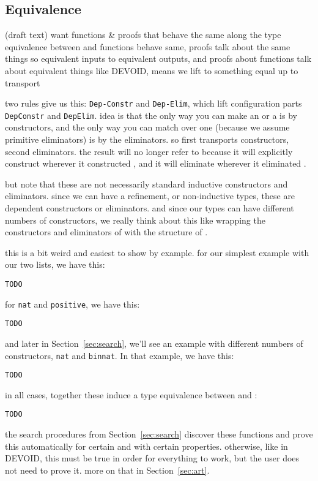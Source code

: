 \subsection{Equivalence}
\label{sec:equivalence}

(draft text) want functions \& proofs that behave the same along the type equivalence between \A and \B
functions behave same, proofs talk about the same things
so equivalent inputs to equivalent outputs, and proofs about functions talk about equivalent things
like DEVOID, means we lift to something equal up to transport

two rules give us this: \lstinline{Dep-Constr} and \lstinline{Dep-Elim},
which lift configuration parts \lstinline{DepConstr} and \lstinline{DepElim}.
idea is that the only way you can make an \A or a \B is by constructors, and the only way you can match over one
(because we assume primitive eliminators) is by the eliminators.
so first transports constructors, second eliminators.
the result will no longer refer to \A because it will explicitly construct \B wherever it constructed \A,
and it will eliminate \B wherever it eliminated \A.

but note that these are not necessarily standard inductive constructors and eliminators.
since we can have a refinement, or non-inductive types, these are dependent constructors or eliminators.
and since our types can have different numbers of constructors, we really think about this like
wrapping the constructors and eliminators of \B with the structure of \A.

this is a bit weird and easiest to show by example.
for our simplest example with our two lists, we have this:

\begin{lstlisting}
TODO
\end{lstlisting}
for \lstinline{nat} and \lstinline{positive}, we have this:

\begin{lstlisting}
TODO
\end{lstlisting}
and later in Section~\ref{sec:search}, we'll see an example with different numbers of constructors,
\lstinline{nat} and \lstinline{binnat}. In that example, we have this:

\begin{lstlisting}
TODO
\end{lstlisting}

in all cases, together these induce a type equivalence between \A and \B:

\begin{lstlisting}
TODO
\end{lstlisting}
the search procedures from Section~\ref{sec:search} discover these functions and prove this automatically
for certain \A and \B with certain properties. otherwise, like in DEVOID, this must be true
in order for everything to work, but the user does not need to prove it.
more on that in Section~\ref{sec:art}.

